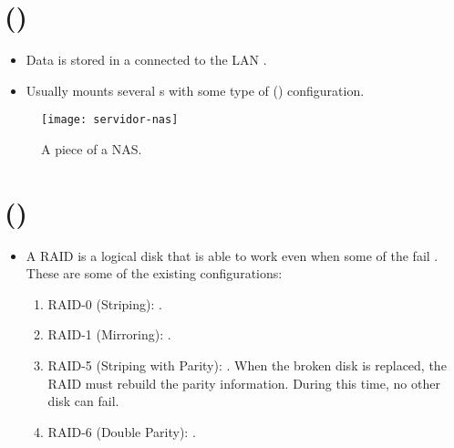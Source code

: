 \section{ ()}
\begin{itemize}
\item Data is stored in a 
  connected to the \gls{LAN} \cite{wikipedia_NAS}.
\item Usually mounts several s with some type of
   () configuration.
\end{itemize}
\begin{figure}[H]
  \vspace{-1ex}
  \centering
  \texttt{[image: servidor-nas]}
  \caption{A piece of a \gls{NAS}.}
  \label{fig:NAS}
\end{figure}

\section{ ()}
\begin{itemize}
\item A \gls{RAID} is a logical disk that is able to work even when
  some of the 
  fail \cite{wikipedia_RAID}. These are some of the existing configurations:
  \begin{enumerate}
  \item RAID-0 (Striping): .
  \item RAID-1 (Mirroring): .
  \item RAID-5 (Striping with Parity): . When the broken disk is replaced, the RAID must
    rebuild the parity information. During this time, no other disk
    can fail.
  \item RAID-6 (Double Parity): .
  \end{enumerate}
\end{itemize}

